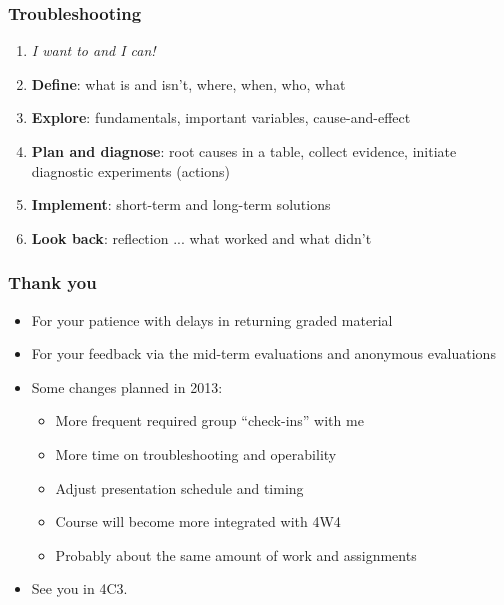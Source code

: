 \begin{frame}\frametitle{Troubleshooting}
	\begin{enumerate}
		\item	\emph{I want to and I can!}
		\item	\textbf{Define}: what is and isn't, where, when, who, what
		\item	\textbf{Explore}: fundamentals, important variables, cause-and-effect
		\item	\textbf{Plan and diagnose}: root causes in a table, collect evidence, initiate diagnostic experiments (actions)
		\item	\textbf{Implement}: short-term and long-term solutions
		\item	\textbf{Look back}: reflection ... what worked and what didn't
	\end{enumerate}
\end{frame}

\begin{frame}\frametitle{Thank you}
	\begin{itemize}
		\item	For your patience with delays in returning graded material
		\item	For your feedback via the mid-term evaluations and anonymous evaluations
		\item	Some changes planned in 2013:
		\begin{itemize}
			\item	More frequent required group ``check-ins'' with me
			\item	More time on troubleshooting and operability
			\item	Adjust presentation schedule and timing
			\item	Course will become more integrated with 4W4
			\item	Probably about the same amount of work and assignments
		\end{itemize}
		
		\vspace{48pt}
		\item	{See you in 4C3.}
	\end{itemize}
\end{frame}

\begin{frame}\frametitle{}
	\begin{exampleblock}{}
		\begin{center}\huge {}
		\end{center}
	\end{exampleblock}
\end{frame}